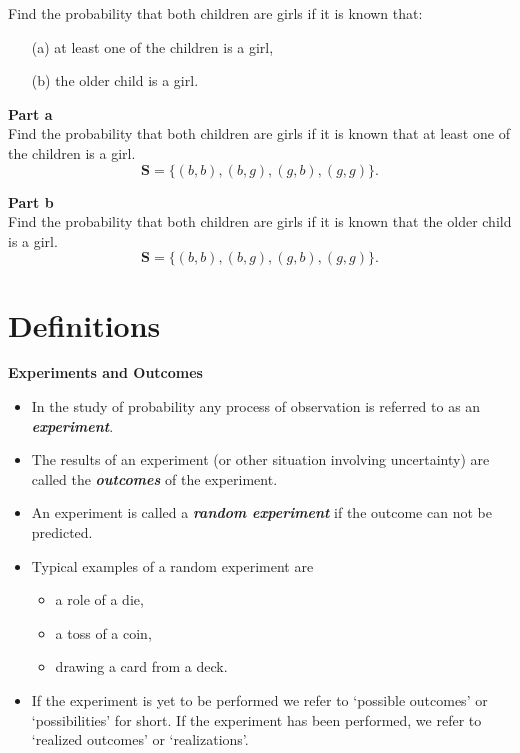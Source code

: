 \documentclass[]{report}
\begin{document}
{%
Find the probability that both children are girls if it is known that: 

\begin{itemize}
\item[(a)] at least one of the children is a girl,
\item[(b)] the older child is a girl. 
\end{itemize}




\textbf{Part a} \\
Find the probability that both children are girls if it is known that at least one of the children is a girl.
\[\boldsymbol{S} = \{ (b,b), (b,g), (g,b), (g,g)\}.\]




\textbf{Part b} \\
Find the probability that both children are girls if it is known that the older child is a girl.
\[\boldsymbol{S} = \{ (b,b), (b,g), (g,b), (g,g)\}.\]


\section{Definitions}

\textbf{Experiments and Outcomes}
\begin{itemize}
\item  In the study of probability any process of observation is referred to as an \textbf{\emph{experiment}}.
\item  The results of an experiment (or other situation involving uncertainty) are called the \textbf{\emph{outcomes }}of the experiment.
\item  An experiment is called a \textbf{\emph{random experiment}} if the outcome can not be predicted.
\item  Typical examples of a random experiment are \begin{itemize} \item  a role of a die, \item  a toss of a coin, \item  drawing a card from a deck.
\end{itemize}
\item  If the experiment is yet to be performed we refer to `possible outcomes' or `possibilities' for short. If the experiment has been performed, we refer to `realized outcomes' or `realizations'.
\end{itemize}




}
\end{document}
